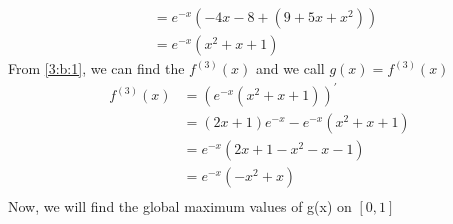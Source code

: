 \documentclass{article}
\begin{document}
\begin{enumerate}[label=({\alph*})]
\begin{align}
                      &= e^{-x}\left(-4x - 8 + (9 + 5x + x^2) \right) \\
                      &= e^{-x}(x^2 + x + 1)  \label{3:b:1}
        \end{align}
        From \eqref{3:b:1}, we can find the \(f^{(3)}(x)\) and we call \(g(x) = f^{(3)}(x)\)
        \begin{align}
            f^{(3)}(x) &=  (e^{-x}(x^2 + x + 1))^{'} \\
                     &= (2x + 1)e^{-x} - e^{-x}(x^2 + x + 1) \\
                     &= e^{-x}(2x + 1 - x^2 - x - 1) \\
                     &= e^{-x}(-x^2 + x) \\
        \end{align}
        Now, we will find the global maximum values of g(x) on \([0, 1]\)
        

\end{enumerate}
\end{document}
